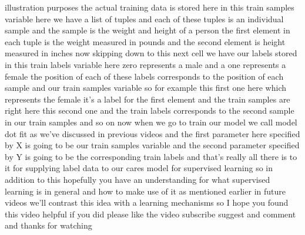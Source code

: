 illustration purposes the actual training data is stored here in this train samples variable here we have a list of tuples and each of these tuples is an individual sample and the sample is the weight and height of a person the first element in each tuple is the weight measured in pounds and the second element is height measured in inches now skipping down to this next cell we have our labels stored in this train labels variable here zero represents a male and a one represents a female the position of each of these labels corresponds to the position of each sample and our train samples variable so for example this first one here which represents the female it's a label for the first element and the train samples are right here this second one and the train labels corresponds to the second sample in our train samples and so on now when we go to train our model we call model dot fit as we've discussed in previous videos and the first parameter here specified by X is going to be our train samples variable and the second parameter specified by Y is going to be the corresponding train labels and that's really all there is to it for supplying label data to our cares model for supervised learning so in addition to this hopefully you have an understanding for what supervised learning is in general and how to make use of it as mentioned earlier in future videos we'll contrast this idea with a learning mechanisms so I hope you found this video helpful if you did please like the video subscribe suggest and comment and thanks for watching

